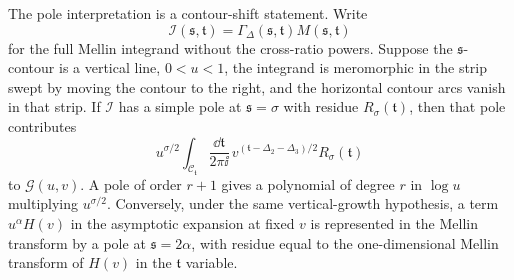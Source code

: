The pole interpretation is a contour-shift statement.  Write
\[
  \mathcal I(\mathfrak s,\mathfrak t)
  =
  \Gamma_\Delta(\mathfrak s,\mathfrak t)M(\mathfrak s,\mathfrak t)
\]
for the full Mellin integrand without the cross-ratio powers.  Suppose the
\(\mathfrak s\)-contour is a vertical line, \(0<u<1\), the integrand is
meromorphic in the strip swept by moving the contour to the right, and the
horizontal contour arcs vanish in that strip.  If
\(\mathcal I\) has a simple pole at \(\mathfrak s=\sigma\) with residue
\(R_\sigma(\mathfrak t)\), then that pole contributes
\begin{equation}
  u^{\sigma/2}
  \int_{\mathcal C_{\mathfrak t}}
  \frac{\dd\mathfrak t}{2\pi\ii}\,
  v^{(\mathfrak t-\Delta_2-\Delta_3)/2}
  R_\sigma(\mathfrak t)
  \label{eq:mellin-simple-pole-u-exponent}
\end{equation}
to \(\mathcal G(u,v)\).  A pole of order \(r+1\) gives a polynomial of degree
\(r\) in \(\log u\) multiplying \(u^{\sigma/2}\).  Conversely, under the same
vertical-growth hypothesis, a term \(u^\alpha H(v)\) in the asymptotic
expansion at fixed \(v\) is represented in the Mellin transform by a pole at
\(\mathfrak s=2\alpha\), with residue equal to the one-dimensional Mellin
transform of \(H(v)\) in the \(\mathfrak t\) variable.

